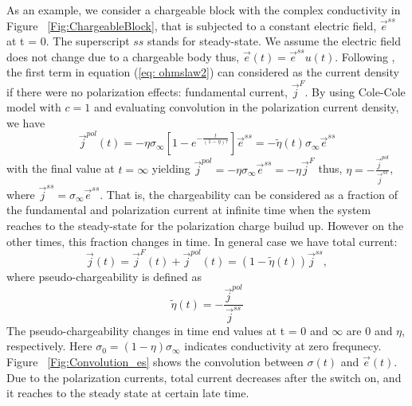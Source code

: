 \documentclass[a4paper, 11pt]{article}
\newcommand{\siginf}{\sigma_\infty}
\renewcommand {\j}  { {\vec j} }
\newcommand {\e}  { {\vec e} }
\newcommand{\peta}{\tilde{\eta}}
\begin{document}
As an example, we consider a chargeable block with the complex conductivity in Figure ~\ref{Fig:ChargeableBlock}, that is subjected to a constant electric field, $\e^{ss}$ at t = 0. The superscript $ss$ stands for steady-state. We assume the electric field does not change due to a chargeable body thus, $\e(t) = \e^{ss}u(t)$. Following \cite{Smith1988a}, the first term in equation (\ref{eq: ohmslaw2}) can considered as the current density if there were no polarization effects: fundamental current, $\j^{F}$. By using Cole-Cole model with $c=1$  and evaluating convolution in the polarization current density, we have
\begin{equation}
	\j^{pol}(t) = -\eta\siginf [1-e^{-\frac{t}{(1-\eta)\tau}}]\e^{ss} = -\peta(t)\siginf\e^{ss}
	\label{eq: IPdensity}
\end{equation}
with the final value at $t = \infty$ yielding $\j^{pol}=-\eta\siginf\e^{ss}=-\eta\j^F$ thus, $\eta = -\frac{\j^{pol}}{\j^{ss}}$, where $\j^{ss}=\siginf \e^{ss}$. That is, the chargeability can be considered as a fraction of the fundamental and polarization current at infinite time when the system reaches to the steady-state for the polarization charge builud up. However on the other times, this fraction changes in time. In general case we have total current:
\begin{equation}
	\j(t) = \j^{F}(t) + \j^{pol}(t) = (1-\peta(t))\j^{ss},
  \label{eq: ohmslaw3}
\end{equation}
where pseudo-chargeability is defined as 
\begin{equation}
  \peta(t) = -\frac{\j^{pol}}{\j^{ss}} 
  \label{eq: pseudochargeability_ss}
\end{equation}
The pseudo-chargeability changes in time end values at t = 0 and $\infty$ are 0 and $\eta$, respectively. Here $\sigma_0=(1-\eta)\siginf$ indicates conductivity at zero frequnecy.  Figure ~\ref{Fig:Convolution_es} shows the convolution between $\sigma(t)$ and $\e(t)$. Due to the polarization currents, total current decreases after the switch on, and it reaches to the steady state at certain late time. 
\end{document}
